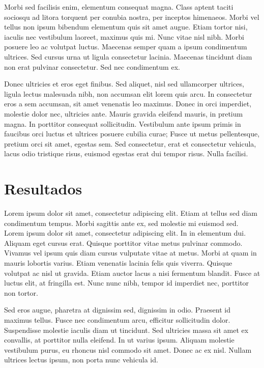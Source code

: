 \documentclass[12pt]{article}
\begin{document}
Morbi sed facilisis enim, elementum consequat magna. Class aptent taciti sociosqu ad litora torquent per conubia nostra, per inceptos himenaeos. Morbi vel tellus non ipsum bibendum elementum quis sit amet augue. Etiam tortor nisi, iaculis nec vestibulum laoreet, maximus quis mi. Nunc vitae nisl nibh. Morbi posuere leo ac volutpat luctus. Maecenas semper quam a ipsum condimentum ultrices. Sed cursus urna ut ligula consectetur lacinia. Maecenas tincidunt diam non erat pulvinar consectetur. Sed nec condimentum ex.

Donec ultricies et eros eget finibus. Sed aliquet, nisl sed ullamcorper ultrices, ligula lectus malesuada nibh, non accumsan elit lorem quis arcu. In consectetur eros a sem accumsan, sit amet venenatis leo maximus. Donec in orci imperdiet, molestie dolor nec, ultricies ante. Mauris gravida eleifend mauris, in pretium magna. In porttitor consequat sollicitudin. Vestibulum ante ipsum primis in faucibus orci luctus et ultrices posuere cubilia curae; Fusce ut metus pellentesque, pretium orci sit amet, egestas sem. Sed consectetur, erat et consectetur vehicula, lacus odio tristique risus, euismod egestas erat dui tempor risus. Nulla facilisi. 

\section{Resultados} 

Lorem ipsum dolor sit amet, consectetur adipiscing elit. Etiam at tellus sed diam condimentum tempus. Morbi sagittis ante ex, sed molestie mi euismod sed. Lorem ipsum dolor sit amet, consectetur adipiscing elit. In in elementum dui. Aliquam eget cursus erat. Quisque porttitor vitae metus pulvinar commodo. Vivamus vel ipsum quis diam cursus vulputate vitae at metus. Morbi at quam in mauris lobortis varius. Etiam venenatis lacinia felis quis viverra. Quisque volutpat ac nisl ut gravida. Etiam auctor lacus a nisi fermentum blandit. Fusce at luctus elit, at fringilla est. Nunc nunc nibh, tempor id imperdiet nec, porttitor non tortor.

Sed eros augue, pharetra at dignissim sed, dignissim in odio. Praesent id maximus tellus. Fusce nec condimentum arcu, efficitur sollicitudin dolor. Suspendisse molestie iaculis diam ut tincidunt. Sed ultricies massa sit amet ex convallis, at porttitor nulla eleifend. In ut varius ipsum. Aliquam molestie vestibulum purus, eu rhoncus nisl commodo sit amet. Donec ac ex nisl. Nullam ultrices lectus ipsum, non porta nunc vehicula id. 
\end{document}
